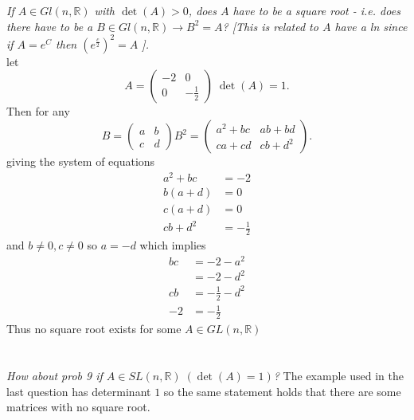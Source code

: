 \documentclass{article}
\begin{document}
    \section{}
    \emph{If $A \in Gl(n, \mathbb{R} )$  with $\det(A) > 0$, does  $A$ have to be a square root - i.e. does there have to be a $B \in Gl(n, \mathbb{R} ) \rightarrow B^2=A$?
    [This is related to $A$ have a ln since if $A=e^{C}$ then $(e^{\frac{c}{2}})^2 = A$ ]. }\\
    let
    \[
    A = 
    \begin{pmatrix}
        -2 & 0 \\
        0 & -\frac{1}{2}
    \end{pmatrix}
    \;
    \det(A) = 1
    .\] 
    Then for any 
    \[
        B =
    \begin{pmatrix}
        a & b\\
        c & d
    \end{pmatrix}
    B^2 =
    \begin{pmatrix}
        a^2+bc & ab+bd\\
        ca+cd & cb + d^2
    \end{pmatrix}
    .\] 
    giving the system of equations
    \begin{align*}
        a^2+bc &= -2\\
        b(a+d) &= 0\\
        c(a+d) &= 0\\
        cb + d^2 &= -\frac{1}{2}
    \end{align*}
    and $b \ne 0, c \ne 0$ so $a = -d$
    which implies 
    \begin{align*}
        bc &= -2 -a^2\\
           &= -2 -d^2\\
        cb &= -\frac{1}{2} - d^2\\
        -2 &= -\frac{1}{2}
    \end{align*}
    Thus no square root exists for some $A \in GL(n, \mathbb{R} )$
    

    \section{}
    \emph{How about prob 9 if $A \in SL(n, \mathbb{R} ) \; (\det(A) = 1)$?}
    The example used in the last question has determinant $1$ so the same statement holds that there are some matrices with no square root.
\end{document}
